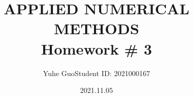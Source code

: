 \documentclass[letterpaper,17pt]{extreport}
\begin{document}
\title{APPLIED NUMERICAL METHODS\\Homework \# 3}
\author{Yuhe Guo\quad Student ID: 2021000167}
\date{2021.11.05}
\maketitle

% 
% 



% 
% 
% 

% 
\end{document}
